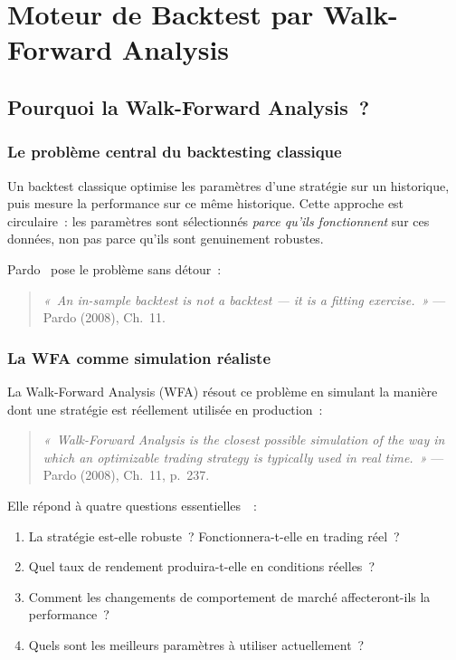 \chapter{Moteur de Backtest par Walk-Forward Analysis}
\label{ch:wfo}

\section{Pourquoi la Walk-Forward Analysis~?}
\label{sec:pourquoi_wfa}

\subsection{Le problème central du backtesting classique}

Un backtest classique optimise les paramètres d'une stratégie sur un historique,
puis mesure la performance sur ce même historique. Cette approche est circulaire~:
les paramètres sont sélectionnés \emph{parce qu'ils fonctionnent} sur ces données,
non pas parce qu'ils sont genuinement robustes.

Pardo~\cite{pardo2008} pose le problème sans détour~:

\begin{quote}
\textit{«~An in-sample backtest is not a backtest — it is a fitting exercise.~»}
— Pardo (2008), Ch.~11.
\end{quote}

\subsection{La WFA comme simulation réaliste}

La Walk-Forward Analysis (WFA) résout ce problème en simulant la manière dont une
stratégie est réellement utilisée en production~:

\begin{quote}
\textit{«~Walk-Forward Analysis is the closest possible simulation of the way in
which an optimizable trading strategy is typically used in real time.~»}
— Pardo (2008), Ch.~11, p.~237.
\end{quote}

Elle répond à quatre questions essentielles~\cite{pardo2008}~:
\begin{enumerate}
    \item La stratégie est-elle robuste~? Fonctionnera-t-elle en trading réel~?
    \item Quel taux de rendement produira-t-elle en conditions réelles~?
    \item Comment les changements de comportement de marché affecteront-ils
    la performance~?
    \item Quels sont les meilleurs paramètres à utiliser actuellement~?
\end{enumerate}

